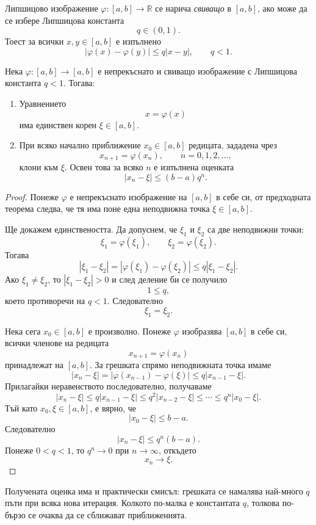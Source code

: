 \begin{defn}
Липшицово изображение $\varphi:[a,b]\to\mathbb{R}$ се нарича \emph{свиващо} в $[a,b]$, ако може да се избере Липшицова константа
\[
q\in(0,1).
\]
Тоест за всички $x,y\in[a,b]$ е изпълнено
\[
|\varphi(x)-\varphi(y)|\leq q|x-y|,
\qquad q<1.
\]
\end{defn}

\begin{thm}
Нека $\varphi:[a,b]\to[a,b]$ е непрекъснато и свиващо изображение с Липшицова константа $q<1$. Тогава:

\begin{enumerate}
\item Уравнението
\[
x=\varphi(x)
\]
има единствен корен $\xi\in[a,b]$.

\item При всяко начално приближение $x_0\in[a,b]$ редицата, зададена чрез
\[
x_{n+1}=\varphi(x_n),\qquad n=0,1,2,\ldots,
\]
клони към $\xi$. Освен това за всяко $n$ е изпълнена оценката
\[
|x_n-\xi|\leq (b-a)q^n.
\]
\end{enumerate}
\end{thm}

\begin{proof}
Понеже $\varphi$ е непрекъснато изображение на $[a,b]$ в себе си, от предходната теорема следва, че тя има поне една неподвижна точка $\xi\in[a,b]$.

Ще докажем единствеността. Да допуснем, че $\xi_1$ и $\xi_2$ са две неподвижни точки:
\[
\xi_1=\varphi(\xi_1),\qquad \xi_2=\varphi(\xi_2).
\]
Тогава
\[
|\xi_1-\xi_2|
=
|\varphi(\xi_1)-\varphi(\xi_2)|
\leq q|\xi_1-\xi_2|.
\]
Ако $\xi_1\neq\xi_2$, то $|\xi_1-\xi_2|>0$ и след деление би се получило
\[
1\leq q,
\]
което противоречи на $q<1$. Следователно
\[
\xi_1=\xi_2.
\]

Нека сега $x_0\in[a,b]$ е произволно. Понеже $\varphi$ изобразява $[a,b]$ в себе си, всички членове на редицата
\[
x_{n+1}=\varphi(x_n)
\]
принадлежат на $[a,b]$. За грешката спрямо неподвижната точка имаме
\[
|x_n-\xi|
=
|\varphi(x_{n-1})-\varphi(\xi)|
\leq q|x_{n-1}-\xi|.
\]
Прилагайки неравенството последователно, получаваме
\[
|x_n-\xi|
\leq q|x_{n-1}-\xi|
\leq q^2|x_{n-2}-\xi|
\leq \cdots \leq q^n|x_0-\xi|.
\]
Тъй като $x_0,\xi\in[a,b]$, е вярно, че
\[
|x_0-\xi|\leq b-a.
\]
Следователно
\[
|x_n-\xi|\leq q^n(b-a).
\]
Понеже $0<q<1$, то $q^n\to0$ при $n\to\infty$, откъдето
\[
x_n\to\xi.
\]
\end{proof}

Получената оценка има и практически смисъл: грешката се намалява най-много $q$ пъти при всяка нова итерация. Колкото по-малка е константата $q$, толкова по-бързо се очаква да се сближават приближенията.

